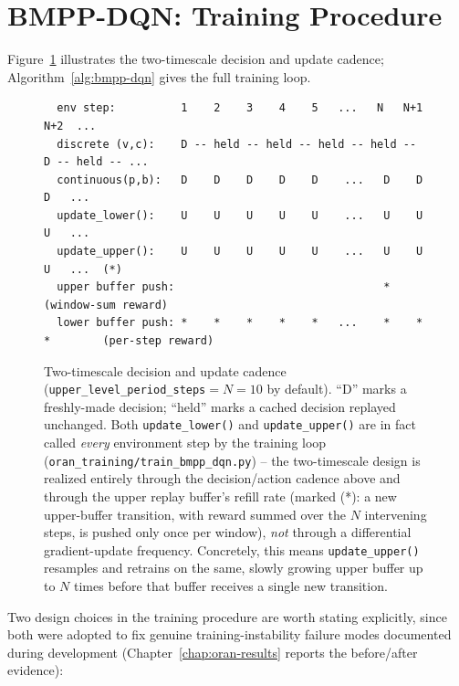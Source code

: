 \section{BMPP-DQN: Training Procedure}
\label{sec:oran-bmpp-training}

Figure~\ref{fig:oran-cadence} illustrates the two-timescale decision and
update cadence; Algorithm~\ref{alg:bmpp-dqn} gives the full training loop.

\begin{figure}[htbp]
\centering
{\footnotesize
\begin{verbatim}
  env step:          1    2    3    4    5   ...   N   N+1  N+2  ...
  discrete (v,c):    D -- held -- held -- held -- held --   D -- held -- ...
  continuous(p,b):   D    D    D    D    D    ...   D    D    D   ...
  update_lower():    U    U    U    U    U    ...   U    U    U   ...
  update_upper():    U    U    U    U    U    ...   U    U    U   ...  (*)
  upper buffer push:                                *                  (window-sum reward)
  lower buffer push: *    *    *    *    *   ...    *    *    *        (per-step reward)
\end{verbatim}
}
\caption{Two-timescale decision and update cadence
  (\texttt{upper\_level\_period\_steps}$=N=10$ by default). ``D'' marks a
  freshly-made decision; ``held'' marks a cached decision replayed
  unchanged. Both \texttt{update\_lower()} and \texttt{update\_upper()}
  are in fact called \emph{every} environment step by the training loop
  (\texttt{oran\_training/train\_bmpp\_dqn.py}) -- the two-timescale
  design is realized entirely through the decision/action cadence above
  and through the upper replay buffer's refill rate (marked (*): a new
  upper-buffer transition, with reward summed over the $N$ intervening
  steps, is pushed only once per window), \emph{not} through a
  differential gradient-update frequency. Concretely, this means
  \texttt{update\_upper()} resamples and retrains on the same, slowly
  growing upper buffer up to $N$ times before that buffer receives a
  single new transition.}
\label{fig:oran-cadence}
\end{figure}

Two design choices in the training procedure are worth stating explicitly,
since both were adopted to fix genuine training-instability failure modes
documented during development (Chapter~\ref{chap:oran-results} reports the
before/after evidence):


